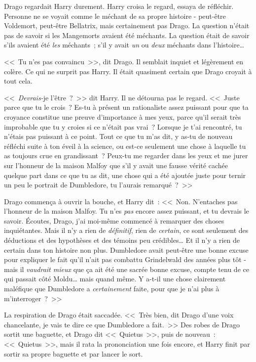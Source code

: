 Drago regardait Harry durement. Harry croisa le regard, essaya de réfléchir. Personne ne se voyait comme le méchant de sa propre histoire - peut-être Voldemort, peut-être Bellatrix, mais certainement pas Drago. La question n'était pas de savoir si les Mangemorts avaient été méchants. La question était de savoir s'ils avaient été \emph{les} méchants~; s'il y avait \emph{un} ou \emph{deux} méchants dans l'histoire…

<<~Tu n'es pas convaincu~>>, dit Drago. Il semblait inquiet et légèrement en colère. Ce qui ne surprit pas Harry. Il était quasiment certain que Drago croyait à tout cela.

<<~\emph{Devrais-}je l'être~?~>> dit Harry. Il ne détourna pas le regard. <<~Juste parce que tu le crois~? Es-tu à présent un rationaliste assez puissant pour que ta croyance constitue une preuve d'importance à mes yeux, parce qu'il serait très improbable que tu y croies si ce n'était pas vrai~? Lorsque je t'ai rencontré, tu n'étais pas puissant à ce point. Tout ce que tu m'as dit, y as-tu de nouveau réfléchi suite à ton éveil à la science, ou est-ce seulement une chose à laquelle tu as toujours crue en grandissant~? Peux-tu me regarder dans les yeux et me jurer sur l'honneur de la maison Malfoy que s'il y avait une fausse vérité cachée quelque part dans ce que tu as dit, une chose qui a été ajoutée juste pour ternir un peu le portrait de Dumbledore, tu l'aurais remarqué~?~>>

Drago commença à ouvrir la bouche, et Harry dit~: <<~Non. N'entaches pas l'honneur de la maison Malfoy. Tu n'es \emph{pas} encore assez puissant, et tu devrais le savoir. Écoutes, Drago, j'ai moi-même commencé à remarquer des choses inquiétantes. Mais il n'y a rien de \emph{définitif}, rien de \emph{certain}, ce sont seulement des déductions et des hypothèses et des témoins peu crédibles… Et il n'y a rien de certain dans ton histoire non plus. Dumbledore avait peut-être une bonne excuse pour expliquer le fait qu'il n'ait pas combattu Grindelwald des années plus tôt - mais il \emph{vaudrait mieux} que ça ait été une sacrée bonne excuse, compte tenu de ce qui passait côté Moldu… mais quand même. Y a-t-il une chose clairement maléfique que Dumbledore a \emph{certainement} faite, pour que je n'ai plus à m'interroger~?~>>

La respiration de Drago était saccadée. <<~Très bien, dit Drago d'une voix chancelante, je vais te dire ce que Dumbledore a fait.~>> Des robes de Drago sortit une baguette, et Drago dit <<~Quietus~>>, puis de nouveau~: <<~Quietus~>>, mais il rata la prononciation une fois encore, et Harry finit par sortir sa propre baguette et par lancer le sort.


